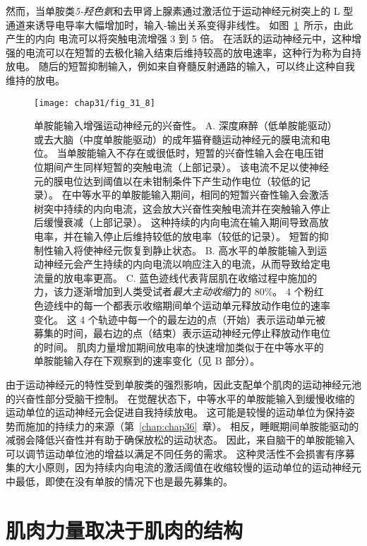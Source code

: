 然而，当单胺类\textit{5-羟色氨}和去甲肾上腺素通过激活位于运动神经元树突上的 L 型  通道来诱导电导率大幅增加时，输入-输出关系变得非线性。
如图~\ref{fig:31_8}~所示，由此产生的内向  电流可以将突触电流增强 3 到 5 倍。
在活跃的运动神经元中，这种增强的电流可以在短暂的去极化输入结束后维持较高的放电速率，这种行为称为自持放电。
随后的短暂抑制输入，例如来自脊髓反射通路的输入，可以终止这种自我维持的放电。


\begin{figure}[htbp]
	\centering
	\texttt{[image: chap31/fig\_31\_8]}
	\caption{单胺能输入增强运动神经元的兴奋性\cite{heckman2009motoneuron,erim1996rank}。
	A. 深度麻醉（低单胺能驱动）或去大脑（中度单胺能驱动）的成年猫脊髓运动神经元的膜电流和电位。
	当单胺能输入不存在或很低时，短暂的兴奋性输入会在电压钳位期间产生同样短暂的突触电流（上部记录）。
	该电流不足以使神经元的膜电位达到阈值以在未钳制条件下产生动作电位（较低的记录）。
	在中等水平的单胺能输入期间，相同的短暂兴奋性输入会激活树突中持续的内向电流，这会放大兴奋性突触电流并在突触输入停止后缓慢衰减（上部记录）。
	这种持续的内向电流在输入期间导致高放电率，并在输入停止后维持较低的放电率（较低的记录）。
	短暂的抑制性输入将使神经元恢复到静止状态。
	B. 高水平的单胺能输入到运动神经元会产生持续的内向电流以响应注入的电流，从而导致给定电流量的放电率更高。
	C. 蓝色迹线代表背屈肌在收缩过程中施加的力，该力逐渐增加到人类受试者\textit{最大主动收缩}力的 80\%。
	4 个粉红色迹线中的每一个都表示收缩期间单个运动单元释放动作电位的速率变化。
	这 4 个轨迹中每一个的最左边的点（开始）表示运动单元被募集的时间，最右边的点（结束）表示运动神经元停止释放动作电位的时间。
	肌肉力量增加期间放电率的快速增加类似于在中等水平的单胺能输入存在下观察到的速率变化（见 B 部分）。}
	\label{fig:31_8}
\end{figure}


由于运动神经元的特性受到单胺类的强烈影响，因此支配单个肌肉的运动神经元池的兴奋性部分受脑干控制。
在觉醒状态下，中等水平的单胺能输入到缓慢收缩的运动单位的运动神经元会促进自我持续放电。
这可能是较慢的运动单位为保持姿势而施加的持续力的来源（第~\ref{chap:chap36}~章）。
相反，睡眠期间单胺能驱动的减弱会降低兴奋性并有助于确保放松的运动状态。
因此，来自脑干的单胺能输入可以调节运动单位池的增益以满足不同任务的需求。
这种灵活性不会损害有序募集的大小原则，因为持续内向电流的激活阈值在收缩较慢的运动单位的运动神经元中最低，即使在没有单胺的情况下也是最先募集的。



\section{肌肉力量取决于肌肉的结构}

